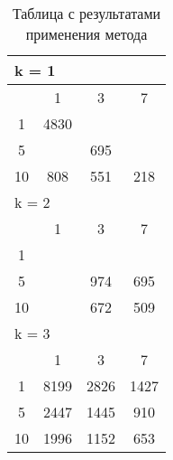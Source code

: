 \begin{table}
\label{sphere_results}
  \centering
  \begin{tabular}{|*4{c|}}
    \hline
    \multicolumn{4}{|l|}{k = 1} \\
    \hline
    \diagbox{$\mu$}{$\lambda$} & \multicolumn{1}{c|}{1} & \multicolumn{1}{c|}{3} & \multicolumn{1}{c|}{7} \\
    \hline
    1 & 4830 & \cellcolor{olive}{2462} & \cellcolor{olive}{878} \\
    \hline
    5 & \cellcolor{olive}{1450} & 695 & \cellcolor{olive}{368} \\
    \hline
    10 & 808 & 551 & 218 \\
    \hline
    \multicolumn{4}{|l|}{k = 2} \\
    \hline
    \diagbox{$\mu$}{$\lambda$} & \multicolumn{1}{c|}{1} & \multicolumn{1}{c|}{3} & \multicolumn{1}{c|}{7} \\
    \hline
    1 & \cellcolor{olive}{4342} & \cellcolor{olive}{2333} & \cellcolor{olive}{1464} \\
    \hline
    5 & \cellcolor{olive}{1891} & 974 & 695 \\
    \hline
    10 & \cellcolor{olive}{1164} & 672 & 509 \\
    \hline
    \multicolumn{4}{|l|}{k = 3} \\
    \hline
    \diagbox{$\mu$}{$\lambda$} & \multicolumn{1}{c|}{1} & \multicolumn{1}{c|}{3} & \multicolumn{1}{c|}{7} \\
    \hline
    1 & 8199 & 2826 & 1427 \\
    \hline
    5 & 2447 & 1445 & 910 \\
    \hline
    10 & 1996 & 1152 & 653 \\
    \hline
  \end{tabular}
  \captionsetup{justification=centering}
  \caption{Таблица с результатами применения метода }
\end{table}


